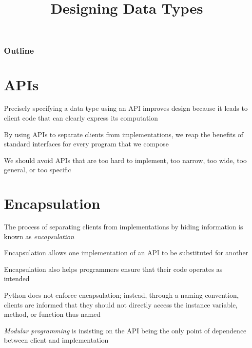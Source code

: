 \documentclass[8pt,a4paper,compress,handout]{beamer}
\title{Designing Data Types}
\date{}
\begin{document}
\begin{frame}
\vfill
\titlepage
\end{frame}

\begin{frame}
\frametitle{Outline}
\tableofcontents
\end{frame}

\section{APIs}
\begin{frame}[fragile]
Precisely specifying a data type using an API improves design because it leads to client code that can clearly express its computation 

\bigskip

By using APIs to separate clients from implementations, we reap the benefits of standard interfaces for every program that we compose

\bigskip

We should avoid APIs that are too hard to implement, too narrow, too wide, too general, or too specific
\end{frame}

\section{Encapsulation}
\begin{frame}[fragile]
The process of separating clients from implementations by hiding information is known as \emph{encapsulation}

\bigskip

Encapsulation allows one implementation of an API to be substituted for another

\bigskip

Encapsulation also helps programmers ensure that their code operates as intended

\bigskip

Python does not enforce encapsulation; instead, through a naming convention, clients are informed that they should not directly access the instance variable, method, or function thus named

\bigskip

\emph{Modular programming} is insisting on the API being the only point of dependence between client and implementation
\end{frame}
\end{document}
